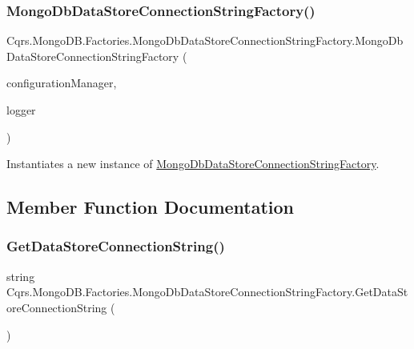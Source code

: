 \subsubsection{\texorpdfstring{Mongo\+Db\+Data\+Store\+Connection\+String\+Factory()}{MongoDbDataStoreConnectionStringFactory()}}
{\footnotesize\ttfamily Cqrs.\+Mongo\+D\+B.\+Factories.\+Mongo\+Db\+Data\+Store\+Connection\+String\+Factory.\+Mongo\+Db\+Data\+Store\+Connection\+String\+Factory (\begin{DoxyParamCaption}\item[{\hyperlink{interfaceCqrs_1_1Configuration_1_1IConfigurationManager}{I\+Configuration\+Manager}}]{configuration\+Manager,  }\item[{I\+Logger}]{logger }\end{DoxyParamCaption})}



Instantiates a new instance of \hyperlink{classCqrs_1_1MongoDB_1_1Factories_1_1MongoDbDataStoreConnectionStringFactory}{Mongo\+Db\+Data\+Store\+Connection\+String\+Factory}. 



\subsection{Member Function Documentation}
\mbox{\label{classCqrs_1_1MongoDB_1_1Factories_1_1MongoDbDataStoreConnectionStringFactory_a76986fcc9521c87bfbb6e417ef13cd53_a76986fcc9521c87bfbb6e417ef13cd53}} 
\subsubsection{\texorpdfstring{Get\+Data\+Store\+Connection\+String()}{GetDataStoreConnectionString()}}
{\footnotesize\ttfamily string Cqrs.\+Mongo\+D\+B.\+Factories.\+Mongo\+Db\+Data\+Store\+Connection\+String\+Factory.\+Get\+Data\+Store\+Connection\+String (\begin{DoxyParamCaption}{ }\end{DoxyParamCaption})}




